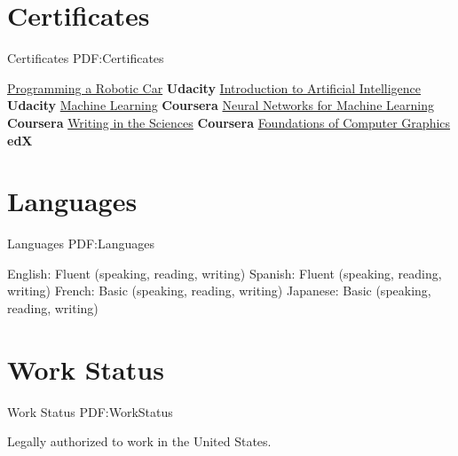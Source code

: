 \documentclass[letterpaper,MMMyyyy,nonstop]{simpleresumecv}
\begin{document}
\begin{body}

\section
{Certificates}
{Certificates}
{PDF:Certificates}

\GapNoBreak
\BulletItem
\href{https://github.com/davidlavy88/resume/blob/master/Certificates/robotic-car-certificate.pdf}
{Programming a Robotic Car}
\hfill
\textbf{Udacity}
\GapNoBreak
\BulletItem
\href{https://github.com/davidlavy88/resume/blob/master/Certificates/artificial-intelligence-certificate.pdf}
{Introduction to Artificial Intelligence}
\hfill
\textbf{Udacity}
\GapNoBreak
\BulletItem
\href{https://github.com/davidlavy88/resume/blob/master/Certificates/machine-learning-certificate.pdf}
{Machine Learning}
\hfill
\textbf{Coursera}
\GapNoBreak
\BulletItem
\href{https://github.com/davidlavy88/resume/blob/master/Certificates/nn-for-ml-certificate.pdf}
{Neural Networks for Machine Learning}
\hfill
\textbf{Coursera}
\GapNoBreak
\BulletItem
\href{https://github.com/davidlavy88/resume/blob/master/Certificates/writing-in-sciences-certificate.pdf}
{Writing in the Sciences}
\hfill
\textbf{Coursera}
\GapNoBreak
\BulletItem
\href{https://github.com/davidlavy88/resume/blob/master/Certificates/cs184-certificate.pdf}
{Foundations of Computer Graphics}
\hfill
\textbf{edX}


\section
{Languages}
{Languages}
{PDF:Languages}

\GapNoBreak
\BulletItem
English: Fluent (speaking, reading, writing)
\GapNoBreak
\BulletItem
Spanish: Fluent (speaking, reading, writing)
\GapNoBreak
\BulletItem
French: Basic (speaking, reading, writing)
\GapNoBreak
\BulletItem
Japanese: Basic (speaking, reading, writing)


\section
{Work Status}
{Work Status}
{PDF:WorkStatus}

Legally authorized to work in the United States.



\end{body}
\end{document}
